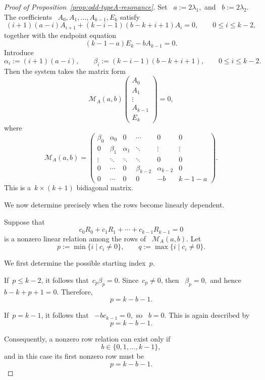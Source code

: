 \documentclass[12pt,a4paper]{amsart}
\theoremstyle{thm}
\theoremstyle{definition}
\begin{document}
\begin{proof}[Proof of Proposition~\textup{\ref{prop:odd-typeA-resonance}}]
Set~%
$
a:=2\lambda_1,
$ and~%
$
b:=2\lambda_2.
$
The coefficients~%
$
A_0,A_1,\ldots,A_{k-1},E_k
$
satisfy
\begin{equation*}
(i+1)(a-i)A_{i+1}
+
(k-i-1)(b-k+i+1)A_i
=
0,
\qquad
0\leq i\leq k-2,
\end{equation*}
together with the endpoint equation
\begin{equation*}
(k-1-a)E_k-bA_{k-1}=0.
\end{equation*}
Introduce
\[
\alpha_i:=(i+1)(a-i),
\qquad
\beta_i:=(k-i-1)(b-k+i+1),
\qquad
0\leq i\leq k-2.
\]
Then the system takes the matrix form
\[
\mathcal M_A(a,b)
\begin{pmatrix}
A_0\\
A_1\\
\vdots\\
A_{k-1}\\
E_k
\end{pmatrix}
=0,
\]
where
\[
\mathcal M_A(a,b)
=
\begin{pmatrix}
\beta_0 & \alpha_0 & 0 & \cdots & 0 & 0\\
0 & \beta_1 & \alpha_1 & \ddots & \vdots & \vdots\\
\vdots & \ddots & \ddots & \ddots & 0 & 0\\
0 & \cdots & 0 & \beta_{k-2} & \alpha_{k-2} & 0\\
0 & \cdots & 0 & 0 & -b & k-1-a
\end{pmatrix}.
\]
This is a~\(k\times(k+1)\) bidiagonal matrix.

We now determine precisely when the rows become linearly dependent.

Suppose that
\[
c_0R_0+c_1R_1+\cdots+c_{k-1}R_{k-1}=0
\]
is a nonzero linear relation among the rows of~%
\(\mathcal M_A(a,b)\). Let
\[
p:=\min\{i\mid c_i\neq0\},
\qquad
q:=\max\{i\mid c_i\neq0\}.
\]

We first determine the possible starting index~\(p\).

If~\(p\leq k-2\), it follows that~$
c_p\beta_p=0.
$ Since~\(c_p\neq0\), then~%
$
\beta_p=0,
$
and hence~%
$
b-k+p+1=0.
$
Therefore,
\[
p=k-b-1.
\]

If~\(p=k-1\), it follows that~%
$
-bc_{k-1}=0,
$
so~%
$
b=0.
$ This is again described by
\[
p=k-b-1.
\]

Consequently, a nonzero row relation can exist only if
\[
b\in\{0,1,\ldots,k-1\},
\]
and in this case its first nonzero row must be
\begin{equation}
p=k-b-1.
\label{eq:typeA-res-start}
\end{equation}


\end{proof}
\end{document}
